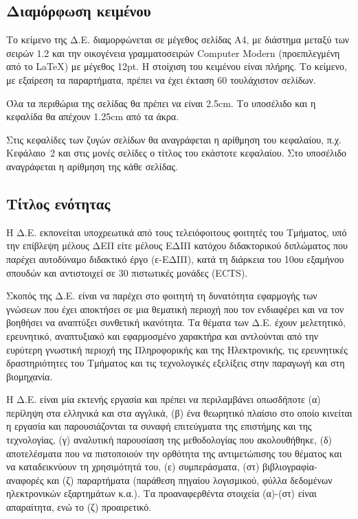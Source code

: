 \documentclass[twoside, a4paper, 11pt]{article}
\begin{document}

\subsection{Διαμόρφωση κειμένου}
Το κείμενο της Δ.Ε. διαμορφώνεται σε μέγεθος σελίδας Α4, με διάστημα μεταξύ των σειρών 1.2 και την οικογένεια γραμματοσειρών Computer Modern (προεπιλεγμένη από το LaTeX) με μέγεθος 12pt. Η στοίχιση του κειμένου είναι πλήρης. Το κείμενο, με εξαίρεση τα παραρτήματα, πρέπει να έχει έκταση 60 τουλάχιστον σελίδων. 

Όλα τα περιθώρια της σελίδας θα πρέπει να είναι 2.5cm. Το υποσέλιδο και η κεφαλίδα θα απέχουν 1.25cm από τα άκρα. 

Στις κεφαλίδες των ζυγών σελίδων θα αναγράφεται η αρίθμηση του κεφαλαίου, π.χ. Κεφάλαιο~2 και στις μονές σελίδες ο τίτλος του εκάστοτε κεφαλαίου. Στο υποσέλιδο αναγράφεται η αρίθμηση της κάθε σελίδας.


\subsection{Τίτλος ενότητας}
Η Δ.Ε. εκπονείται υποχρεωτικά από τους τελειόφοιτους φοιτητές του Τμήματος, υπό την επίβλεψη μέλους ΔΕΠ είτε μέλους ΕΔΙΠ κατόχου διδακτορικού διπλώματος που παρέχει αυτοδύναμο διδακτικό έργο (ε-ΕΔΙΠ), κατά τη διάρκεια του 10ου εξαμήνου σπουδών και αντιστοιχεί σε 30 πιστωτικές μονάδες (ECTS).



Σκοπός της Δ.Ε. είναι να παρέχει στο φοιτητή τη δυνατότητα εφαρμογής των γνώσεων που έχει αποκτήσει σε μια θεματική περιοχή που τον ενδιαφέρει και να τον βοηθήσει να αναπτύξει συνθετική ικανότητα. Τα θέματα των Δ.Ε. έχουν μελετητικό, ερευνητικό, αναπτυξιακό και εφαρμοσμένο χαρακτήρα και αντλούνται από την ευρύτερη γνωστική περιοχή της Πληροφορικής και της Ηλεκτρονικής, τις ερευνητικές δραστηριότητες του Τμήματος και τις τεχνολογικές εξελίξεις στην παραγωγή και στη βιομηχανία. 


Η Δ.Ε. είναι μία εκτενής εργασία και πρέπει να περιλαμβάνει οπωσδήποτε (α) περίληψη στα ελληνικά και στα αγγλικά, (β) ένα θεωρητικό πλαίσιο στο οποίο κινείται η εργασία και παρουσιάζονται τα συναφή επιτεύγματα της επιστήμης και της τεχνολογίας, (γ) αναλυτική παρουσίαση της μεθοδολογίας που ακολουθήθηκε, (δ) αποτελέσματα που να πιστοποιούν την ορθότητα της αντιμετώπισης του θέματος και να καταδεικνύουν τη χρησιμότητά του, (ε) συμπεράσματα, (στ) βιβλιογραφία-αναφορές και (ζ) παραρτήματα (παράθεση πηγαίου λογισμικού, φύλλα δεδομένων ηλεκτρονικών εξαρτημάτων κ.α.). Τα προαναφερθέντα στοιχεία (α)-(στ) είναι απαραίτητα, ενώ το (ζ) προαιρετικό.
\end{document}
